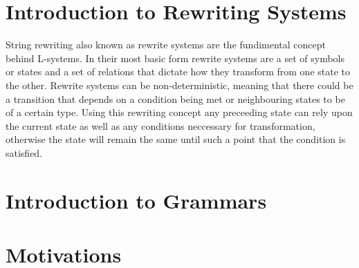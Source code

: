 \section{Introduction to Rewriting Systems}

\begin{flushleft}

String rewriting also known as rewrite systems are the fundimental concept behind L-systems. In their most basic form rewrite systems are a set of symbols or states and a set of relations that dictate how they transform from one state to the other. Rewrite systems can be non-deterministic, meaning that there could be a transition that depends on a condition being met or neighbouring states to be of a certain type. Using this rewriting concept any preceeding state can rely upon the current state as well as any conditions neccessary for transformation, otherwise the state will remain the same until such a point that the condition is satisfied. 

\end{flushleft}

\section{Introduction to Grammars}

\begin{flushleft}



\end{flushleft}

\section{Motivations}
 
